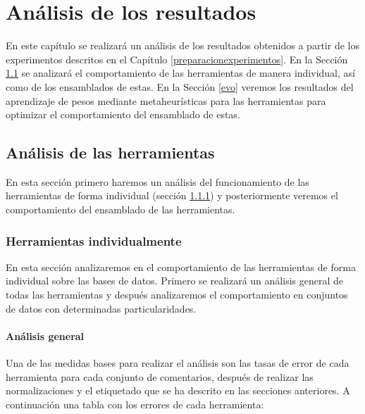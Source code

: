 \chapter{Análisis de los resultados}
En este capítulo se realizará un análisis de los resultados obtenidos a partir de los experimentos descritos en el Capítulo \ref{preparacionexperimentos}. En la Sección \ref{tools} se analizará el comportamiento de las herramientas de manera individual, así como de los ensamblados de estas. En la Sección \ref{evo} veremos los resultados del aprendizaje de pesos mediante metaheurísticas para las herramientas para optimizar el comportamiento del ensamblado de estas.

\section{Análisis de las herramientas} \label{tools}
En esta sección primero haremos un análisis del funcionamiento de las herramientas de forma individual (sección \ref{individual}) y posteriormente veremos el comportamiento del ensamblado de las herramientas.

\subsection{Herramientas individualmente} \label{individual}
En esta sección analizaremos en el comportamiento de las herramientas de forma individual sobre las bases de datos. Primero se realizará un análisis general de todas las herramientas y después analizaremos el comportamiento en conjuntos de datos con determinadas particularidades.

\subsubsection{Análisis general}
Una de las medidas bases para realizar el análisis son las tasas de error de cada herramienta para cada conjunto de comentarios, después de realizar las normalizaciones y el etiquetado que se ha descrito en las secciones anteriores. A continuación una tabla con los errores de cada herramienta:
 
